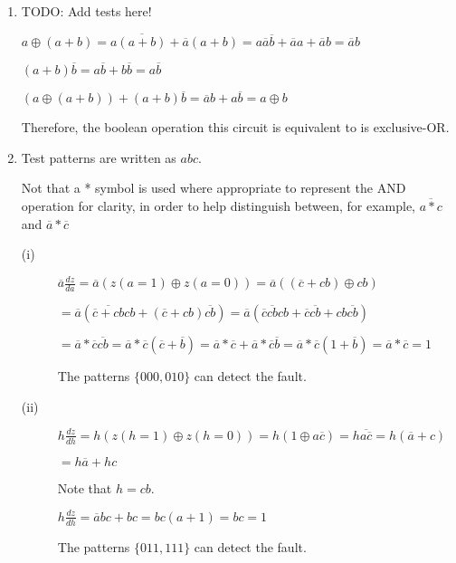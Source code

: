 \documentclass[a4paper,12pt]{article}
\begin{document}
\begin{enumerate}
        \item TODO: Add tests here!

        $a \oplus (a + b) = a\overline{(a + b)} + \overline{a}(a + b) = a\overline{a}\overline{b} + \overline{a}a + \overline{a}b = \overline{a}b$

        $(a + b)\overline{b} = a\overline{b} + b\overline{b} = a\overline{b}$

        $(a \oplus (a + b)) + (a + b)\overline{b} = \overline{a}b + a\overline{b} = a \oplus b $

        Therefore, the boolean operation this circuit is equivalent to is exclusive-OR.

        \item Test patterns are written as $abc$.

            Not that a * symbol is used where appropriate to represent the AND operation for clarity, in order to help distinguish between, for example, $\overline{a*c}$ and $\overline{a}*\overline{c}$
            \begin{description}
                \item[(i)] $\overline{a}\frac{dz}{da} = \overline{a}(z(a = 1) \oplus z(a = 0)) = \overline{a}((\overline{c} + cb) \oplus cb)$

                    $= \overline{a}(\overline{\overline{c} + cb}cb + (\overline{c} + cb)\overline{cb}) = \overline{a}(\overline{c}\overline{cb}cb + \overline{c}\overline{cb} + cb\overline{cb})$

                    $= \overline{a} * \overline{c}\overline{cb} = \overline{a} * \overline{c}(\overline{c} + \overline{b}) = \overline{a} * \overline{c} + \overline{a} * \overline{c}\overline{b} = \overline{a} * \overline{c}(1 + \overline{b}) = \overline{a} * \overline{c} = 1$

                    The patterns $\{000, 010\}$ can detect the fault.

                \item[(ii)] $h\frac{dz}{dh} = h(z(h = 1) \oplus z(h = 0)) = h(1 \oplus a\overline{c}) = h\overline{a\overline{c}} = h(\overline{a} + c)$

                    $= h\overline{a} + hc$

                    Note that $h = cb$.

                    $h\frac{dz}{dh} = \overline{a}bc + bc = bc(a + 1) = bc = 1$

                    The patterns $\{011, 111\}$ can detect the fault.


\end{description}
\end{enumerate}
\end{document}
